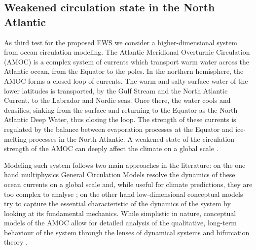\documentclass[a4paper,fleqn]{cas-sc}
\begin{document}
\subsection{Weakened circulation state in the North Atlantic}\label{subsec:AMOC}
As third test for the proposed EWS we consider a higher-dimensional system from ocean circulation modeling.
The Atlantic Meridional Overturnic Circulation (AMOC) is a complex system of currents which transport warm water across the Atlantic ocean, from the Equator to the poles.
In the northern hemisphere, the AMOC forms a closed loop of currents.
The warm and salty surface water of the lower latitudes is transported, by the Gulf Stream and the North Atlantic Current, to the Labrador and Nordic seas.
Once there, the water cools and densifies, sinking from the surface and returning to the Equator as the North Atlantic Deep Water, thus closing the loop.
The strength of these currents is regulated by the balance between evaporation processes at the Equator and ice-melting processes in the North Atlantic. 
A weakened state of the circulation strength of the AMOC can deeply affect the climate on a global scale \cite{Sutton2012,vanWesten025b,Dijkstra2026}.

Modeling such system follows two main approaches in the literature: on the one hand multiphysics General Circulation Models resolve the dynamics of these ocean currents on a global scale and, while useful for climate predictions, they are too complex to analyse \cite{vanWesten2023,vanWesten025a}; on the other hand low-dimensional conceptual models try to capture the essential characteristic of the dynamics of the system by looking at its fundamental mechanics.
While simplistic in nature, conceptual models of the AMOC allow for detailed analysis of the qualitative, long-term behaviour of the system through the lenses of dynamical systems and bifurcation theory \cite{Alkhayuon2019,Mancini2026}.
\end{document}
